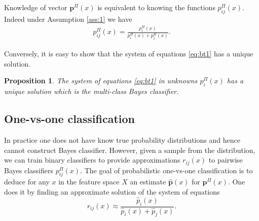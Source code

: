 \documentclass[twoside,11pt]{article}
\newtheorem{prop}{Proposition}
\begin{document}
Knowledge of vector $\boldsymbol{p}^\Pi(x)$ is  equivalent to knowing the functions $p^\Pi_{ij}(x)$. Indeed under Assumption \ref{ass:1} we have
\begin{align}
p_{ij}^\Pi(x) = \frac{p_i^\Pi(x)}{p_i^\Pi(x) + p_j^\Pi(x)}. \label{eq:bt1}
\end{align}

Conversely, it is easy to show that  the system of equations \eqref{eq:bt1} has a unique solution.

\begin{prop} \label{prop:binary2multi}
The system of  equations \eqref{eq:bt1} in unknowns $p_i^\Pi(x)$ has a unique solution which is the multi-class Bayes classifier.
\end{prop}


\subsection{One-vs-one classification }


In practice one does not have know true probability distributions and hence cannot construct Bayes classifier. However, given a sample from the distribution, we can train binary classifiers to provide approximations $r_{ij}(x)$ to pairwise Bayes classifiers $p_{ij}^\Pi(x)$. The goal of probabilistic one-vs-one classification is to deduce for any $x$ in the feature space $X$ an estimate $\hat{\boldsymbol{p}}(x)$ for $\boldsymbol{p}^\Pi(x)$. One does it by finding an approximate solution of the system of equations
%
%
%
%
%
%
%
%
\begin{equation}
	{r}_{ij}(x) \approx \frac {\hat p_i(x)}{\hat p_i(x) + \hat p_j(x)}. \label{eq:bt2}
\end{equation}
\end{document}
